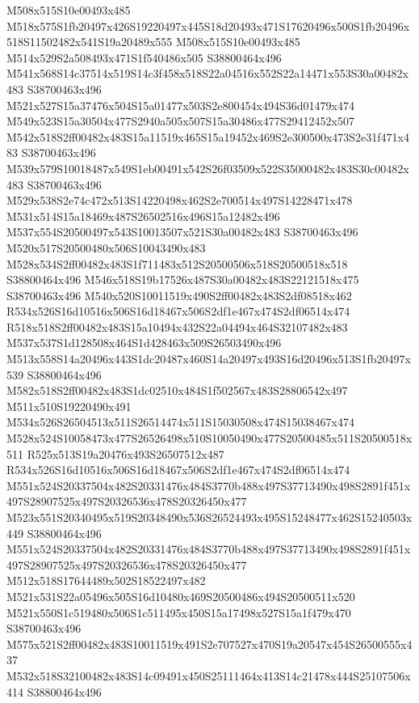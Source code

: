 \documentclass{article}
\begin{document}
\begin{multicols}{2}
M508x515S10e00493x485 M518x575S1fb20497x426S19220497x445S18d20493x471S17620496x500S1fb20496x518S11502482x541S19a20489x555 M508x515S10e00493x485 M514x529S2a508493x471S1f540486x505 S38800464x496 M541x568S14c37514x519S14c3f458x518S22a04516x552S22a14471x553S30a00482x483 S38700463x496 M521x527S15a37476x504S15a01477x503S2e800454x494S36d01479x474 M549x523S15a30504x477S2940a505x507S15a30486x477S29412452x507 M542x518S2ff00482x483S15a11519x465S15a19452x469S2e300500x473S2e31f471x483 S38700463x496 M539x579S10018487x549S1eb00491x542S26f03509x522S35000482x483S30c00482x483 S38700463x496 M529x538S2e74c472x513S14220498x462S2e700514x497S14228471x478 M531x514S15a18469x487S26502516x496S15a12482x496 M537x554S20500497x543S10013507x521S30a00482x483 S38700463x496 M520x517S20500480x506S10043490x483 M528x534S2ff00482x483S1f711483x512S20500506x518S20500518x518 S38800464x496 M546x518S19b17526x487S30a00482x483S22121518x475 S38700463x496 M540x520S10011519x490S2ff00482x483S2df08518x462 R534x526S16d10516x506S16d18467x506S2df1e467x474S2df06514x474 R518x518S2ff00482x483S15a10494x432S22a04494x464S32107482x483 M537x537S1d128508x464S1d428463x509S26503490x496 M513x558S14a20496x443S1dc20487x460S14a20497x493S16d20496x513S1fb20497x539 S38800464x496 M582x518S2ff00482x483S1dc02510x484S1f502567x483S28806542x497 M511x510S19220490x491 M534x526S26504513x511S26514474x511S15030508x474S15038467x474 M528x524S10058473x477S26526498x510S10050490x477S20500485x511S20500518x511 R525x513S19a20476x493S26507512x487 R534x526S16d10516x506S16d18467x506S2df1e467x474S2df06514x474 M551x524S20337504x482S20331476x484S3770b488x497S37713490x498S2891f451x497S28907525x497S20326536x478S20326450x477 M523x551S20340495x519S20348490x536S26524493x495S15248477x462S15240503x449 S38800464x496 M551x524S20337504x482S20331476x484S3770b488x497S37713490x498S2891f451x497S28907525x497S20326536x478S20326450x477 M512x518S17644489x502S18522497x482 M521x531S22a05496x505S16d10480x469S20500486x494S20500511x520 M521x550S1c519480x506S1c511495x450S15a17498x527S15a1f479x470 S38700463x496 M575x521S2ff00482x483S10011519x491S2e707527x470S19a20547x454S26500555x437 M532x518S32100482x483S14c09491x450S25111464x413S14c21478x444S25107506x414 S38800464x496




\end{multicols}
\end{document}
